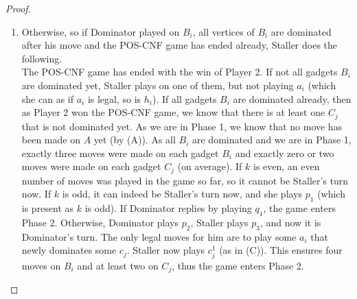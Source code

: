 \documentclass[12pt]{article}
\begin{document}
\begin{proof}
\begin{description}
\begin{enumerate}[(1)]
%			
			
			\item Otherwise, so if Dominator played on $B_i$, all vertices of $B_i$ are dominated after his move and the POS-CNF game has ended already, Staller does the following.\\
			The POS-CNF game has ended with the win of Player 2. If not all gadgets $B_i$ are dominated yet, Staller plays on one of them, but not playing $a_i$ (which she can as if $a_i$ is legal, so is $h_i$). If all gadgets $B_i$ are dominated already, then as Player 2 won the POS-CNF game, we know that there is at least one $C_j$ that is not dominated yet. As we are in Phase 1, we know that no move has been made on $A$ yet (by (A)). As all $B_i$ are dominated and we are in Phase 1, exactly three moves were made on each gadget $B_i$ and exactly zero or two moves were made on each gadget $C_j$ (on average). If $k$ is even, an even number of moves was played in the game so far, so it cannot be Staller's turn now. If $k$ is odd, it can indeed be Staller's turn now, and she plays $p_1$ (which is present as $k$ is odd). If Dominator replies by playing $q_1$, the game enters Phase 2. Otherwise, Dominator plays $p_2$, Staller plays $p_3$, and now it is Dominator's turn. The only legal moves for him are to play some $a_i$ that newly dominates some $c_j$. Staller now plays $c_j^1$ (as in (C)). This ensures four moves on $B_i$ and at least two on $C_j$, thus the game enters Phase 2.
		\end{enumerate}
		

\end{description}
\end{proof}
\end{document}
